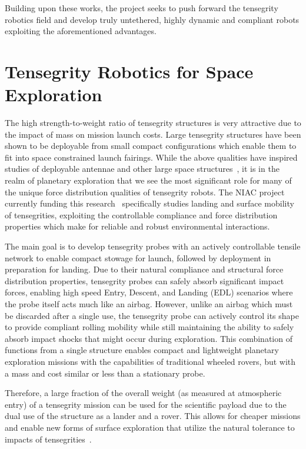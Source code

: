 Building upon these works, the \SB{} project seeks to push forward the tensegrity robotics field and develop truly untethered, highly dynamic and compliant robots exploiting the aforementioned advantages.

\section{Tensegrity Robotics for Space Exploration}
The high strength-to-weight ratio of tensegrity structures is very attractive due to the impact of mass on mission launch costs. 
Large tensegrity structures have been shown to be deployable from small compact configurations which enable them to fit into space constrained launch fairings.   
While the above qualities have inspired studies of deployable antennae and other large space structures~\cite{Tibert2002}, 
it is in the realm of planetary exploration that we see the most significant role for many of the unique force distribution qualities of tensegrity robots.  
The NIAC project currently funding this research~\cite{NIACfinalreport} specifically studies landing and surface mobility of tensegrities,
exploiting the controllable compliance and force distribution properties which make for reliable and robust environmental interactions.  

The main goal is to develop tensegrity probes with an actively controllable tensile network
 to enable compact stowage for launch, followed by deployment in preparation for landing. 
Due to their natural compliance and 
structural force distribution properties, tensegrity probes can safely absorb 
significant impact forces, enabling high speed Entry, Descent, and Landing 
(EDL) scenarios where the probe itself acts much like an airbag.  However, 
unlike an airbag which must be discarded after a single use, the tensegrity 
probe can actively control its shape to provide compliant rolling mobility 
while still maintaining the ability to safely absorb impact shocks that might 
occur during exploration.  This combination of functions from a single 
structure enables compact and lightweight planetary exploration missions 
with the capabilities of traditional wheeled rovers, but with a mass and 
cost similar or less than a stationary probe.   

Therefore, a large fraction of the overall weight (as measured at atmospheric entry) of a tensegrity mission can be used for the scientific payload 
due to the dual use of the structure as a lander and a rover. 
This allows for cheaper missions and enable new forms of surface exploration that utilize the natural tolerance to impacts of tensegrities~\cite{Vytas_IPPW_2013}.

